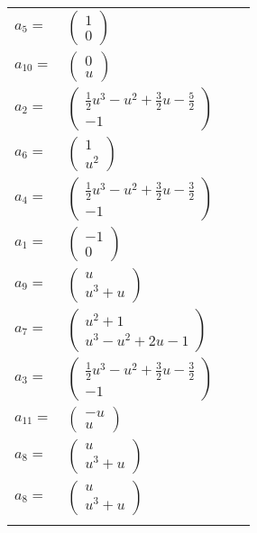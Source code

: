 \documentclass[1p]{elsarticle_modified}
\theoremstyle{definition}
\begin{document}
\begin{tabular}{m{7pt} m{180pt} m{7pt} m{180pt} }
\flushright $a_{5}=$&$\begin{pmatrix}1\\0\end{pmatrix}$ \\
\flushright $a_{10}=$&$\begin{pmatrix}0\\u\end{pmatrix}$ \\
\flushright $a_{2}=$&$\begin{pmatrix}\frac{1}{2} u^3- u^2+\frac{3}{2} u-\frac{5}{2}\\-1\end{pmatrix}$ \\
\flushright $a_{6}=$&$\begin{pmatrix}1\\u^2\end{pmatrix}$ \\
\flushright $a_{4}=$&$\begin{pmatrix}\frac{1}{2} u^3- u^2+\frac{3}{2} u-\frac{3}{2}\\-1\end{pmatrix}$ \\
\flushright $a_{1}=$&$\begin{pmatrix}-1\\0\end{pmatrix}$ \\
\flushright $a_{9}=$&$\begin{pmatrix}u\\u^3+u\end{pmatrix}$ \\
\flushright $a_{7}=$&$\begin{pmatrix}u^2+1\\u^3- u^2+2 u-1\end{pmatrix}$ \\
\flushright $a_{3}=$&$\begin{pmatrix}\frac{1}{2} u^3- u^2+\frac{3}{2} u-\frac{3}{2}\\-1\end{pmatrix}$ \\
\flushright $a_{11}=$&$\begin{pmatrix}- u\\u\end{pmatrix}$ \\
\flushright $a_{8}=$&$\begin{pmatrix}u\\u^3+u\end{pmatrix}$\\ \flushright $a_{8}=$&$\begin{pmatrix}u\\u^3+u\end{pmatrix}$\\&\end{tabular}
\end{document}
